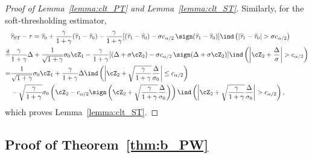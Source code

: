 \documentclass[11pt]{article}
\newcommand{\htau}{\widehat\tau}
\numberwithin{equation}{section}
\theoremstyle{definition}
\begin{document}
\begin{proof}[Proof of Lemma~\ref{lemma:clt_PT} and Lemma~\ref{lemma:clt_ST}]
Similarly, for the soft-thresholding estimator,
\begin{align*}
  &\htau_{\rm ST} - \tau =\htau_0 + \frac{\gamma}{1+\gamma} (\htau_1 - \htau_0) - \frac{\gamma}{1+\gamma} [(\htau_1 - \htau_0) - \sigma c_{\alpha/2}\,\sign(\htau_1 - \htau_0)] \ind\left(\lvert \htau_1 - \htau_0 \rvert >  \sigma c_{\alpha/2}\right)\\
  \stackrel{\sf d}{=}& \frac{\gamma}{1+\gamma} \Delta + \frac{1}{\sqrt{1+\gamma}} \sigma_0 \cZ_1 - \frac{\gamma}{1+\gamma} [(\Delta + \sigma \cZ_2) - \sigma c_{\alpha/2}\,\sign(\Delta + \sigma \cZ_2)] \ind\left(\left\lvert \cZ_2 + \frac{\Delta}{\sigma}\right\rvert > c_{\alpha/2}\right)\\
  =&\frac{1}{\sqrt{1+\gamma}}\sigma_0\cZ_1 +  \frac{\gamma}{1+\gamma} \Delta\ind\left(\left\lvert \cZ_2 + \sqrt{\frac{\gamma}{1+\gamma}}\frac{\Delta}{\sigma_0}\right\rvert \le c_{\alpha/2}\right) \\
  &- \sqrt{\frac{\gamma}{1+\gamma}} \sigma_0\left(\cZ_2 - c_{\alpha/2}\sign\left(\cZ_2 + \sqrt{\frac{\gamma}{1+\gamma}}\frac{\Delta}{\sigma_0}\right)\right)\ind\left(\left\lvert \cZ_2 + \sqrt{\frac{\gamma}{1+\gamma}}\frac{\Delta}{\sigma_0}\right\rvert > c_{\alpha/2}\right),
\end{align*}
which proves Lemma~\ref{lemma:clt_ST}.


\end{proof}

\subsection{Proof of Theorem~\ref{thm:b_PW}}
\end{document}
